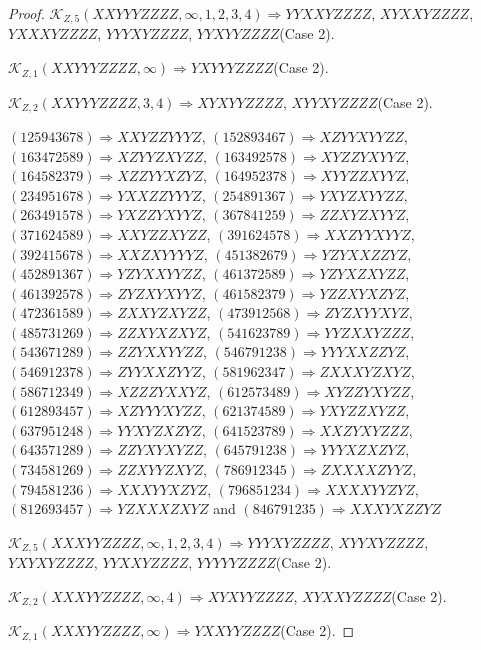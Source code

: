 \documentclass[12pt]{article}
\theoremstyle{plain}
\theoremstyle{definition}
\theoremstyle{remark}
\newcommand{\fancy}[1]{\mathcal{#1}}
\def\K{\fancy{K}}
\begin{document}
\begin{proof}
	
	$\K_{Z,5}(XXYYYZZZZ,\infty,1, 2, 3, 4)\Rightarrow $$YYXXYZZZZ$, $XYXXYZZZZ$, $YXXXYZZZZ$, $YYYXYZZZZ$, $YYXYYZZZZ$(Case 2).
	
	$\K_{Z,1}(XXYYYZZZZ,\infty)\Rightarrow $$YXYYYZZZZ$(Case 2).
	
	$\K_{Z,2}(XXYYYZZZZ,3, 4)\Rightarrow $$XYXYYZZZZ$, $XYYXYZZZZ$(Case 2).
	
	
	
	$(1 2 5 9 4 3 6 7 8)\Rightarrow XXYZZYYYZ$, $(1 5 2 8 9 3 4 6 7)\Rightarrow XZYYXYYZZ$, $(1 6 3 4 7 2 5 8 9)\Rightarrow XZYYZXYZZ$, $(1 6 3 4 9 2 5 7 8)\Rightarrow XYZZYXYYZ$, $(1 6 4 5 8 2 3 7 9)\Rightarrow XZZYYXZYZ$, $(1 6 4 9 5 2 3 7 8)\Rightarrow XYYZZXYYZ$, $(2 3 4 9 5 1 6 7 8)\Rightarrow YXXZZYYYZ$, $(2 5 4 8 9 1 3 6 7)\Rightarrow YXYZXYYZZ$, $(2 6 3 4 9 1 5 7 8)\Rightarrow YXZZYXYYZ$, $(3 6 7 8 4 1 2 5 9)\Rightarrow ZZXYZXYYZ$, $(3 7 1 6 2 4 5 8 9)\Rightarrow XXYZZXYZZ$, $(3 9 1 6 2 4 5 7 8)\Rightarrow XXZYYXYYZ$, $(3 9 2 4 1 5 6 7 8)\Rightarrow XXZXYYYYZ$, $(4 5 1 3 8 2 6 7 9)\Rightarrow YZYXXZZYZ$, $(4 5 2 8 9 1 3 6 7)\Rightarrow YZYXXYYZZ$, $(4 6 1 3 7 2 5 8 9)\Rightarrow YZYXZXYZZ$, $(4 6 1 3 9 2 5 7 8)\Rightarrow ZYZXYXYYZ$, $(4 6 1 5 8 2 3 7 9)\Rightarrow YZZXYXZYZ$, $(4 7 2 3 6 1 5 8 9)\Rightarrow ZXXYZXYZZ$, $(4 7 3 9 1 2 5 6 8)\Rightarrow ZYZXYYXYZ$, $(4 8 5 7 3 1 2 6 9)\Rightarrow ZZXYXZXYZ$, $(5 4 1 6 2 3 7 8 9)\Rightarrow YYZXXYZZZ$, $(5 4 3 6 7 1 2 8 9)\Rightarrow ZZYXXYYZZ$, $(5 4 6 7 9 1 2 3 8)\Rightarrow YYYXXZZYZ$, $(5 4 6 9 1 2 3 7 8)\Rightarrow ZYYXXZYYZ$, $(5 8 1 9 6 2 3 4 7)\Rightarrow ZXXXYZXYZ$, $(5 8 6 7 1 2 3 4 9)\Rightarrow XZZZYXXYZ$, $(6 1 2 5 7 3 4 8 9)\Rightarrow XYZZYXYZZ$, $(6 1 2 8 9 3 4 5 7)\Rightarrow XZYYYXYZZ$, $(6 2 1 3 7 4 5 8 9)\Rightarrow YXYZZXYZZ$, $(6 3 7 9 5 1 2 4 8)\Rightarrow YYXYZXZYZ$, $(6 4 1 5 2 3 7 8 9)\Rightarrow XXZYXYZZZ$, $(6 4 3 5 7 1 2 8 9)\Rightarrow ZZYXYXYZZ$, $(6 4 5 7 9 1 2 3 8)\Rightarrow YYYXZXZYZ$, $(7 3 4 5 8 1 2 6 9)\Rightarrow ZZXYYZXYZ$, $(7 8 6 9 1 2 3 4 5)\Rightarrow ZXXXXZYYZ$, $(7 9 4 5 8 1 2 3 6)\Rightarrow XXXYYXZYZ$, $(7 9 6 8 5 1 2 3 4)\Rightarrow XXXXYYZYZ$, $(8 1 2 6 9 3 4 5 7)\Rightarrow YZXXXZXYZ$ and $(8 4 6 7 9 1 2 3 5)\Rightarrow XXXYXZZYZ$
	
	
	$\K_{Z,5}(XXXYYZZZZ,\infty,1, 2, 3, 4)\Rightarrow $$YYYXYZZZZ$, $XYYXYZZZZ$, $YXYXYZZZZ$, $YYXXYZZZZ$, $YYYYYZZZZ$(Case 2).
	
	$\K_{Z,2}(XXXYYZZZZ,\infty,4)\Rightarrow $$XYXYYZZZZ$, $XYXXYZZZZ$(Case 2).
	
	$\K_{Z,1}(XXXYYZZZZ,\infty)\Rightarrow $$YXXYYZZZZ$(Case 2).
	

\end{proof}
\end{document}
